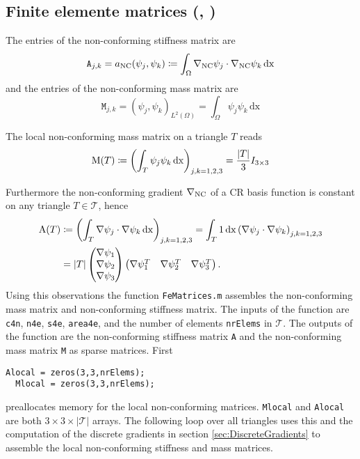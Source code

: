 \subsection{Finite elemente matrices (\cite{Carstensen2017script},
\cite{CarstensenBrennerFEM})}
 
The entries of the non-conforming stiffness matrix are
\begin{equation*}
  \texttt{A}_{j,k} = 
  a_{\textup{NC}}(\psi_j,\psi_k)
  \coloneqq
  \int_{\Omega}\nabla_{\textup{NC}}\psi_j\cdot\nabla_{\textup{NC}}\psi_k\, \mathrm{dx}
\end{equation*}
and the entries of the non-conforming mass matrix are
\begin{equation*}
  \texttt{M}_{j,k} = 
  (\psi_j,\psi_k)_{L^2(\Omega)} =
  \int_{\Omega}\psi_j\psi_k\, \mathrm{dx}
\end{equation*}


The local non-conforming mass matrix on a triangle $T$ reads
\begin{equation*}
  \textup{M}(T) \coloneqq
  \left(
  \int_T \psi_j\psi_k \, \mathrm{dx}\right)_{j,k=1,2,3}
  =
  \frac{|T|}{3}
  I_{3\times3}
\end{equation*}

Furthermore the non-conforming gradient $\nabla_{\textup{NC}}$ of a CR basis function is 
constant on any triangle $T\in\mathcal{T}$, hence
\begin{align*}
  \textup{A}(T) &\coloneqq
  \left(
  \int_T \nabla \psi_j\cdot\nabla\psi_k \, \mathrm{dx}\right)_{j,k=1,2,3}
  =
   \int_T 1 \, \mathrm{dx}\left( \nabla \psi_j\cdot\nabla\psi_k \right)_{j,k=1,2,3}\\
 &=
  |T|
  \begin{pmatrix}
    \nabla \psi_1\\
    \nabla \psi_2\\
    \nabla \psi_3\\
  \end{pmatrix}
  \begin{pmatrix}
    \nabla \psi_1^T&
    \nabla \psi_2^T&
    \nabla \psi_3^T\\
  \end{pmatrix}.
\end{align*}
Using this observations the function \texttt{FeMatrices.m} assembles
the non-conforming mass matrix and non-conforming stiffness matrix.
The inputs of the function are \texttt{c4n},
\texttt{n4e}, \texttt{s4e}, \texttt{area4e}, and the number of elements \texttt{nrElems} in $\mathcal T$.
The outputs of the function are the non-conforming stiffness matrix \texttt{A} and the
non-conforming mass matrix \texttt{M} as sparse matrices.
First
\begin{lstlisting}[frame = single, numbers = none]
  Alocal = zeros(3,3,nrElems);
  Mlocal = zeros(3,3,nrElems);
\end{lstlisting}
preallocates memory for the local non-conforming matrices.
\texttt{Mlocal} and \texttt{Alocal} are both $3\times 3\times 
|\mathcal{T}|$ arrays. 
The following loop over all triangles uses this
and the computation of the discrete gradients in section \ref{sec:DiscreteGradients} 
to assemble the 
local non-conforming stiffness and mass matrices. 

